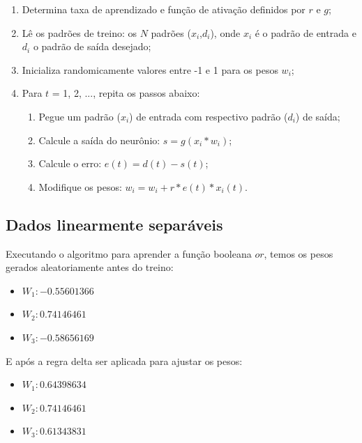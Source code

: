 \documentclass[a4paper,11pt]{article}
\begin{document}
		\begin{enumerate}
			
			\item Determina taxa de aprendizado e função de ativação definidos por $r$ e $g$;
			
			\item Lê os padrões de treino: os $N$ padrões ($x_i$,$d_i$), onde $x_i$ é o padrão de entrada e $d_i$ o padrão de saída desejado;
			
			\item Inicializa randomicamente valores entre -1 e 1 para os pesos $w_i$;
			
			\item Para $t$ = 1, 2, ..., repita os passos abaixo:
			
			\begin{enumerate}
				
				\item Pegue um padrão ($x_i$) de entrada com respectivo padrão ($d_i$) de saída;
				
				\item Calcule a saída do neurônio: $s = g(x_i*w_i)$;
				
				\item Calcule o erro: $e(t)=d(t)-s(t)$;
				
				\item Modifique os pesos: $w_i = w_i + r*e(t)*x_i(t)$.
				
			\end{enumerate}
		
		\end{enumerate}
	
		\subsection{Dados linearmente separáveis}
			Executando o algoritmo para aprender a função booleana $or$, temos os pesos gerados aleatoriamente antes do treino: 
			\begin{itemize}[label={}]
				\item $W_1: -0.55601366$
				\item $W_2:  0.74146461$
				\item $W_3: -0.58656169$
			\end{itemize}
			E após a regra delta ser aplicada para ajustar os pesos: 
			\begin{itemize}[label={}]
				\item $W_1: 0.64398634$
				\item $W_2: 0.74146461$
				\item $W_3: 0.61343831$
			\end{itemize}
		
\end{document}
